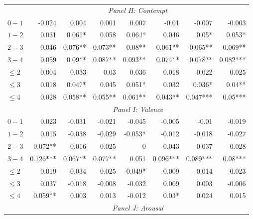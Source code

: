 \documentclass[]{article}
\begin{document}
\begin{table}[!htb]
\begin{tabular}{lrrrrrrr}
& \multicolumn{7}{c}{\emph{Panel H: Contempt}}\\ 

\cmidrule(lr){1-1} \cmidrule(lr){2-8}
$0-1$ & -0.024    & 0.004     & 0.001     & 0.007     & -0.01     & -0.007    & -0.003    \\ 
  $1-2$ & 0.031     & 0.061*    & 0.058     & 0.064*    & 0.046     & 0.05*     & 0.053*    \\ 
  $2-3$ & 0.046     & 0.076**   & 0.073**   & 0.08**    & 0.061**   & 0.065**   & 0.069**   \\ 
  $3-4$ & 0.059     & 0.09**    & 0.087**   & 0.093**   & 0.074**   & 0.078**   & 0.082***  \\ 
$\leq 2$ & 0.004     & 0.033     & 0.03      & 0.036     & 0.018     & 0.022     & 0.025     \\ 
$\leq 3$ & 0.018     & 0.047*    & 0.045     & 0.051*    & 0.032     & 0.036*    & 0.04**    \\ 
$\leq 4$ & 0.028     & 0.058**   & 0.055**   & 0.061**   & 0.043**   & 0.047***  & 0.05***   \\ 
\cmidrule(lr){2-8} 

& \multicolumn{7}{c}{\emph{Panel I: Valence}}\\ 

\cmidrule(lr){1-1} \cmidrule(lr){2-8}
$0-1$ & 0.023     & -0.031    & -0.021    & -0.045    & -0.005    & -0.01     & -0.019    \\ 
  $1-2$ & 0.015     & -0.038    & -0.029    & -0.053*   & -0.012    & -0.018    & -0.027    \\ 
  $2-3$ & 0.072**   & 0.016     & 0.025     & 0         & 0.043     & 0.037     & 0.028     \\ 
  $3-4$ & 0.126***  & 0.067**   & 0.077**   & 0.051     & 0.096***  & 0.089***  & 0.08***   \\ 
$\leq 2$ & 0.019     & -0.034    & -0.025    & -0.049*   & -0.009    & -0.014    & -0.023    \\ 
$\leq 3$ & 0.037     & -0.018    & -0.008    & -0.032    & 0.009     & 0.003     & -0.006    \\ 
$\leq 4$ & 0.059**   & 0.003     & 0.013     & -0.012    & 0.03*     & 0.024     & 0.015     \\ 
\cmidrule(lr){2-8} 

& \multicolumn{7}{c}{\emph{Panel J: Arousal}}\\ 


\end{tabular}
\end{table}
\end{document}
